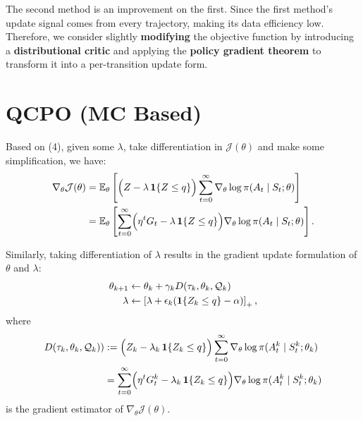 The second method is an improvement on the first. Since the first method's update signal comes from every trajectory, making its data efficiency low. Therefore, we consider slightly \textbf{modifying} the objective function by introducing a \textbf{distributional critic} and applying the \textbf{policy gradient theorem} to transform it into a per-transition update form.

\section{QCPO (MC Based)}
Based on (4), given some $\lambda$, take differentiation in $\mathcal{J}(\theta)$ and make some simplification, we have:
\begin{align} \label{mix_gradient}
    \nabla_\theta\mathcal{J}(\theta)
    &=\mathbb E_{\theta}\left[\Bigl(Z-\lambda\,\mathbf 1\{Z\le q\}\Bigr)\sum_{t=0}^\infty\nabla_\theta\log\pi(A_t\mid S_t;\theta)\right]\\
    &=\mathbb E_{\theta}\left[\sum_{t=0}^\infty\Bigl(\eta^t G_t-\lambda\,\mathbf 1\{Z\le q\}\Bigr) \nabla_\theta\log\pi(A_t\mid S_t;\theta)\right].
\end{align}

Similarly, taking differentiation of $\lambda$ results in the gradient update formulation of $\theta$ and $\lambda$:
\begin{align}
    \theta_{k+1} &\gets \theta_k+\gamma_kD(\tau_k,\theta_k,\mathcal{Q}_k) \notag \\
    \lambda & \gets \left[\lambda + \epsilon_k(\mathbf 1\{Z_k\le q\}-\alpha)\right]_{+},
\end{align}
where
\begin{align}
    D(\tau_k,\theta_k,\mathcal{Q}_k))    &:=\Bigl(Z_k-\lambda_k\,\mathbf 1\{Z_k\le q\}\Bigr)\sum_{t=0}^\infty\nabla_\theta \log \pi(A_t^k\mid S_t^k;\theta_k) \notag \\
    &= \sum_{t=0}^\infty \Bigl(\eta^t G_t^k-\lambda_k\,\mathbf 1\{Z_k\le q\}\Bigr) \nabla_\theta \log \pi(A_t^k\mid S_t^k;\theta_k)
\end{align}
is the gradient estimator of $\nabla_\theta\mathcal{J}(\theta)$.

